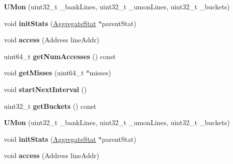 \begin{DoxyCompactItemize}
\item 
\hypertarget{classUMon_a3685f727993e9abd378bf488472f0d8c}{{\bfseries U\-Mon} (uint32\-\_\-t \-\_\-bank\-Lines, uint32\-\_\-t \-\_\-umon\-Lines, uint32\-\_\-t \-\_\-buckets)}\label{classUMon_a3685f727993e9abd378bf488472f0d8c}

\item 
\hypertarget{classUMon_a5c6a57fbfe2f8cd2d1efd5559ab93abe}{void {\bfseries init\-Stats} (\hyperlink{classAggregateStat}{Aggregate\-Stat} $\ast$parent\-Stat)}\label{classUMon_a5c6a57fbfe2f8cd2d1efd5559ab93abe}

\item 
\hypertarget{classUMon_adf8c7528fab287f2cbf2bfeaa2dcb1c0}{void {\bfseries access} (Address line\-Addr)}\label{classUMon_adf8c7528fab287f2cbf2bfeaa2dcb1c0}

\item 
\hypertarget{classUMon_a0f90608dbef871ecc9ebeda383ab276f}{uint64\-\_\-t {\bfseries get\-Num\-Accesses} () const }\label{classUMon_a0f90608dbef871ecc9ebeda383ab276f}

\item 
\hypertarget{classUMon_a3692df466d03a027aeeb6d8b4d21d53c}{void {\bfseries get\-Misses} (uint64\-\_\-t $\ast$misses)}\label{classUMon_a3692df466d03a027aeeb6d8b4d21d53c}

\item 
\hypertarget{classUMon_ac01d1d8753cf7cebbe4b35648faa4c3c}{void {\bfseries start\-Next\-Interval} ()}\label{classUMon_ac01d1d8753cf7cebbe4b35648faa4c3c}

\item 
\hypertarget{classUMon_a9836e828ed4cd975429234b881592876}{uint32\-\_\-t {\bfseries get\-Buckets} () const }\label{classUMon_a9836e828ed4cd975429234b881592876}

\item 
\hypertarget{classUMon_a3685f727993e9abd378bf488472f0d8c}{{\bfseries U\-Mon} (uint32\-\_\-t \-\_\-bank\-Lines, uint32\-\_\-t \-\_\-umon\-Lines, uint32\-\_\-t \-\_\-buckets)}\label{classUMon_a3685f727993e9abd378bf488472f0d8c}

\item 
\hypertarget{classUMon_a5c6a57fbfe2f8cd2d1efd5559ab93abe}{void {\bfseries init\-Stats} (\hyperlink{classAggregateStat}{Aggregate\-Stat} $\ast$parent\-Stat)}\label{classUMon_a5c6a57fbfe2f8cd2d1efd5559ab93abe}

\item 
\hypertarget{classUMon_adf8c7528fab287f2cbf2bfeaa2dcb1c0}{void {\bfseries access} (Address line\-Addr)}\label{classUMon_adf8c7528fab287f2cbf2bfeaa2dcb1c0}


\end{DoxyCompactItemize}
